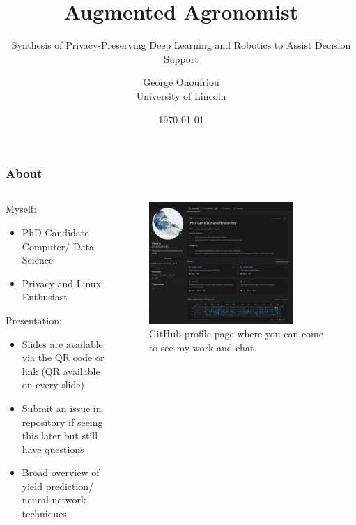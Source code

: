 \documentclass[aspectratio=169]{beamer}
\title{Augmented Agronomist}
\subtitle{Synthesis of Privacy-Preserving Deep Learning and Robotics to Assist Decision Support}
\author{George Onoufriou\\University of Lincoln}
\date{\today}
\begin{document}

  \frame{\titlepage}

  \begin{frame}
    \frametitle{About}
    \begin{columns}
      \begin{column}{0.5\textwidth}
        Myself:
        \begin{itemize}
          \item PhD Candidate Computer/ Data Science
          \item Privacy and Linux Enthusiast
        \end{itemize}
        Presentation:
        \begin{itemize}
          \item Slides are available via the QR code or link (QR available on every slide)
          \item Submit an issue in repository if seeing this later but still have questions
          \item Broad overview of yield prediction/ neural network techniques
        \end{itemize}
      \end{column}
      \begin{column}{0.5\textwidth}
        \begin{figure}[th!]
          \centering
          \includegraphics[width=0.8\textwidth]{gh.png}
          \caption{GitHub profile page where you can come to see my work and chat. \autocite{repository}}
          \label{fig:gh}
        \end{figure}
      \end{column}
    \end{columns}
  \end{frame}
\end{document}
